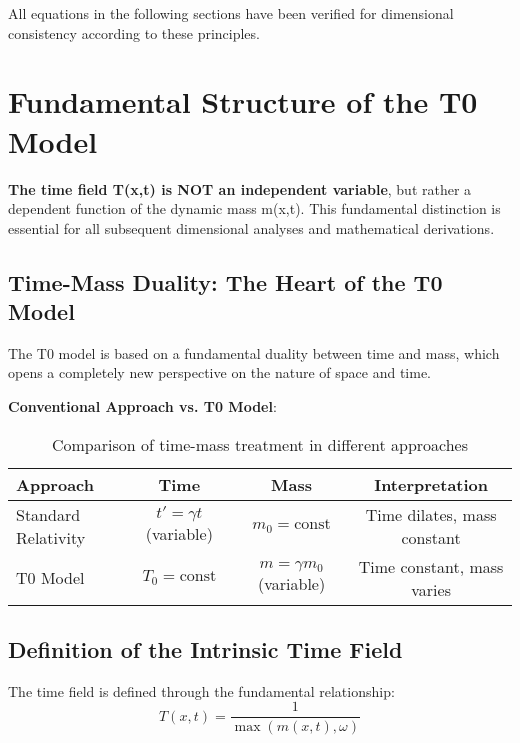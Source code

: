 \documentclass[12pt,a4paper]{article}
\begin{document}
	All equations in the following sections have been verified for dimensional consistency according to these principles.
	
	\section{Fundamental Structure of the T0 Model}
	\label{sec:fundamental_structure}
	
	\begin{tcolorbox}[colback=red!5!white,colframe=red!75!black,title=Critical Note on Mathematical Structure]
		\textbf{The time field T(x,t) is NOT an independent variable}, but rather a dependent function of the dynamic mass m(x,t). This fundamental distinction is essential for all subsequent dimensional analyses and mathematical derivations.
	\end{tcolorbox}
	
	\subsection{Time-Mass Duality: The Heart of the T0 Model}
	\label{subsec:time_mass_duality}
	
	The T0 model is based on a fundamental duality between time and mass, which opens a completely new perspective on the nature of space and time.
	
	\textbf{Conventional Approach vs. T0 Model}:
	
	\begin{table}[htbp]
		\centering
		\begin{tabular}{|l|c|c|c|}
			\hline
			\textbf{Approach} & \textbf{Time} & \textbf{Mass} & \textbf{Interpretation} \\
			\hline
			Standard Relativity & $t' = \gamma t$ (variable) & $m_0 = \text{const}$ & Time dilates, mass constant \\
			\hline
			T0 Model & $T_0 = \text{const}$ & $m = \gamma m_0$ (variable) & Time constant, mass varies \\
			\hline
		\end{tabular}
		\caption{Comparison of time-mass treatment in different approaches}
	\end{table}
	
	\subsection{Definition of the Intrinsic Time Field}
	
	The time field is defined through the fundamental relationship:
	\begin{equation}
		\label{eq:time_field_fundamental}
		T(x,t) = \frac{1}{\max(m(x,t), \omega)}
	\end{equation}
	
\end{document}
